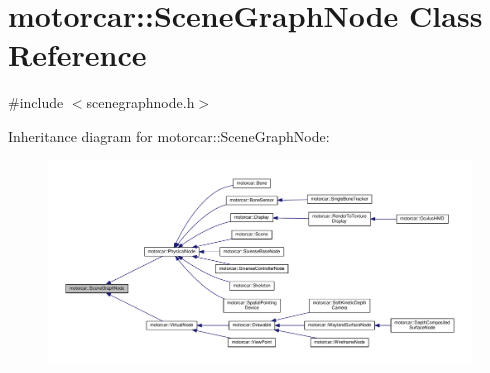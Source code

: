 \hypertarget{classmotorcar_1_1SceneGraphNode}{\section{motorcar\-:\-:Scene\-Graph\-Node Class Reference}
\label{classmotorcar_1_1SceneGraphNode}
}


{\ttfamily \#include $<$scenegraphnode.\-h$>$}



Inheritance diagram for motorcar\-:\-:Scene\-Graph\-Node\-:
\nopagebreak
\begin{figure}[H]
\begin{center}
\leavevmode
\includegraphics[width=350pt]{classmotorcar_1_1SceneGraphNode__inherit__graph}
\end{center}
\end{figure}
